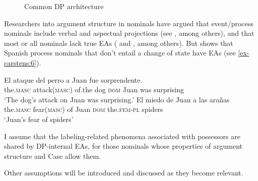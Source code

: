 \documentclass[output=paper
,modfonts
,nonflat]{langsci/langscibook}
\begin{document}
\begin{figure}
	 \caption{Common DP architecture\label{ex-carstens:5}}
\end{figure} \pagebreak
\noindent Researchers into argument structure in nominals have argued that event/process nominals include verbal and aspectual projections (see \citealt{Borer1993,Hazout1995}, among others), and that most or all nominals lack true EAs (\citealt{Picallo1991} and \citealt{Alexiadou2001}, among others). But \citet{Lopez2018} shows that Spanish process nominals that don’t entail a change of state have EAs (see \ref{ex-carstens:6}).

	\begin{exe}
		\ex \label{ex-carstens:6}
		\xlist
		\ex \citep [86]{Lopez2018}\newline
		\gll El         ataque        del     perro  a      Juan fue sorprendente.\\
		the.\textsc{masc}   attack(\textsc{masc}) of.the dog     \textsc{dom}    Juan      was surprising\\
		\glt `The dog's attack on Juan was surprising.' 	
		\ex \citep[91]{Lopez2018}\newline
		\gll El         miedo       de Juan a     las          arañas\\
		the.\textsc{masc}   fear(\textsc{masc})  of Juan  \textsc{dom}   the.\textsc{fem-pl}   spiders\\
		\glt `Juan's fear of spiders' 
		\endxlist
\end{exe}
I assume that the labeling-related phenomena associated with possessors are shared by DP-internal EAs, for those nominals whose properties of argument structure and Case allow them. 

Other assumptions will be introduced and discussed as they become relevant.
\end{document}
